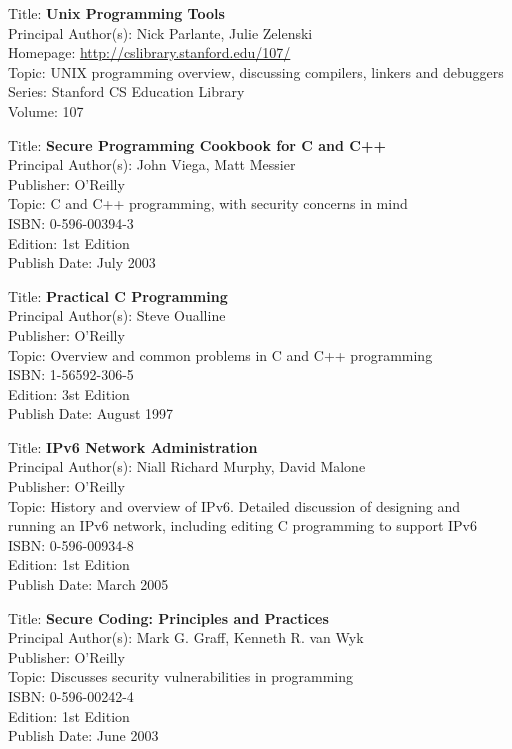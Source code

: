
Title: 	\textbf{Unix Programming Tools}	\\
Principal Author(s): 	Nick Parlante, Julie Zelenski \\
Homepage: 	\url{http://cslibrary.stanford.edu/107/}	\\	
Topic:		UNIX programming overview, discussing compilers, linkers and debuggers \\
Series:		Stanford CS Education Library	\\
Volume:		107 


Title: 	\textbf{Secure Programming Cookbook for C and C++}	\\
Principal Author(s): 	John Viega, Matt Messier  \\
Publisher:	O'Reilly	\\	
Topic:		C and C++ programming, with security concerns in mind \\
ISBN:			0-596-00394-3 \\
Edition:		1st Edition \\
Publish Date:		July 2003

	
Title: 	\textbf{Practical C Programming}	\\
Principal Author(s): 	Steve Oualline  \\
Publisher:	O'Reilly	\\	
Topic:		Overview and common problems in C and C++ programming \\
ISBN:			1-56592-306-5 \\
Edition:		3st Edition \\
Publish Date:		August 1997


Title: 	\textbf{IPv6 Network Administration}	\\
Principal Author(s): 	Niall Richard Murphy, David Malone  \\
Publisher:	O'Reilly	\\	
Topic:		History and overview of IPv6. Detailed discussion of
designing and running an IPv6 network, including editing C programming
to support IPv6 \\
ISBN:			0-596-00934-8 \\
Edition:		1st Edition \\
Publish Date:		March 2005


Title: 	\textbf{Secure Coding: Principles and Practices}	\\
Principal Author(s): 	Mark G. Graff, Kenneth R. van Wyk  \\
Publisher:	O'Reilly	\\	
Topic:		Discusses security vulnerabilities in programming \\
ISBN:			0-596-00242-4 \\
Edition:		1st Edition \\
Publish Date:		June 2003


